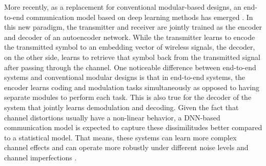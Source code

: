 More recently, as a replacement for conventional modular-based designs, an end-to-end communication model based on deep learning methods has emerged \cite{o2017introduction}. In this new paradigm, the transmitter and receiver are jointly trained as the encoder and decoder of an autoencoder network. While the transmitter learns to encode the transmitted symbol to an embedding vector of wireless signals, the decoder, on the other side, learns to retrieve that symbol back from the transmitted signal after passing through the channel. One noticeable difference between end-to-end systems and conventional modular designs is that in end-to-end systems, the encoder learns coding and modulation tasks simultaneously as opposed to having separate modules to perform each task. This is also true for the decoder of the system that jointly learns demodulation and decoding. Given the fact that channel distortions usually have a non-linear behavior, a DNN-based communication model is expected to capture these dissimilitudes better compared to a statistical model. That means, these systems can learn more complex channel effects and can operate more robustly under different noise levels and channel imperfections \cite{wang2017deep}.